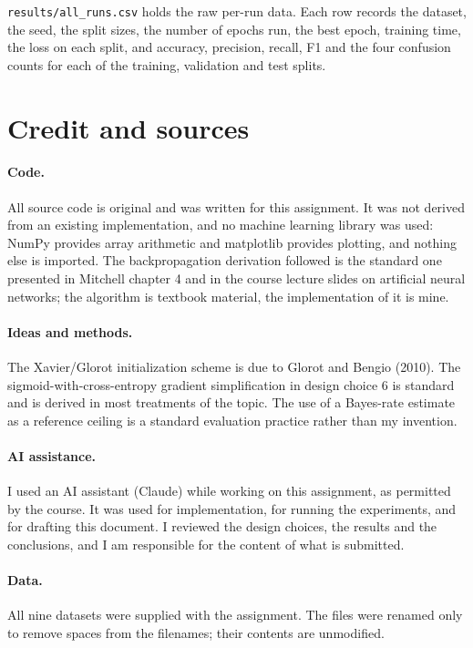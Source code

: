 \documentclass[11pt]{article}
\begin{document}
\texttt{results/all\_runs.csv} holds the raw per-run data. Each row records the
dataset, the seed, the split sizes, the number of epochs run, the best epoch,
training time, the loss on each split, and accuracy, precision, recall, F1 and
the four confusion counts for each of the training, validation and test splits.

\section{Credit and sources}

\paragraph{Code.} All source code is original and was written for this
assignment. It was not derived from an existing implementation, and no machine
learning library was used: NumPy provides array arithmetic and matplotlib
provides plotting, and nothing else is imported. The backpropagation
derivation followed is the standard one presented in Mitchell chapter 4 and in
the course lecture slides on artificial neural networks; the algorithm is
textbook material, the implementation of it is mine.

\paragraph{Ideas and methods.} The Xavier/Glorot initialization scheme is due to
Glorot and Bengio (2010). The sigmoid-with-cross-entropy gradient
simplification in design choice 6 is standard and is derived in most
treatments of the topic. The use of a Bayes-rate estimate as a reference
ceiling is a standard evaluation practice rather than my invention.

\paragraph{AI assistance.} I used an AI assistant (Claude) while working on this
assignment, as permitted by the course. It was used for implementation, for
running the experiments, and for drafting this document. I reviewed the design
choices, the results and the conclusions, and I am responsible for the content
of what is submitted.

\paragraph{Data.} All nine datasets were supplied with the assignment. The files
were renamed only to remove spaces from the filenames; their contents are
unmodified.
\end{document}
